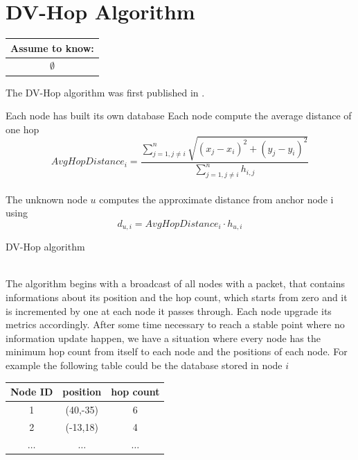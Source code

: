 \documentclass[12pt]{report}
\begin{document}
\section{DV-Hop Algorithm}
\begin{center}
    \begin{tabular}{ |c| } 
    \hline
    \multicolumn{1}{|c|}{ \textbf{Assume to know:} } \\
    \hline
    $\emptyset$\\
    \hline
    \end{tabular}
\end{center}
The DV-Hop algorithm was first published in \cite{965964}.\\
\begin{algorithm}[H]
\SetAlgoLined
{}
Each node has built its own database\;
Each node compute the average distance of one hop
\begin{equation}
    AvgHopDistance_i=\frac{\sum_{j=1,j\neq i}^n\sqrt{(x_j-x_i)^2+(y_j-y_i)^2}}{\sum_{j=1,j\neq i}^nh_{i,j}}
\end{equation}\\
The unknown node $u$ computes the approximate distance from anchor node i using 
\begin{equation}
    d_{u,i}=AvgHopDistance_i \cdot h_{u,i}
    \label{eq:19}
\end{equation}
 \caption{DV-Hop algorithm}
\end{algorithm}
\noindent\\
The algorithm begins with a broadcast of all nodes with a packet, that contains informations about its position and the hop count, which starts from zero and it is incremented by one at each node it passes through. Each node upgrade its metrics accordingly. After some time necessary to reach a stable point where no information update happen, we have a situation where every node has the minimum hop count from itself to each node and the positions of each node. For example the following table could be the database stored in node $i$
\begin{center}
\begin{tabular}{ |c|c|c| } 
 \hline
 Node ID & position & hop count \\ 
 \hline
 \hline
 1 & (40,-35) & 6 \\ 
 2 & (-13,18) & 4 \\
 $\hdots$ & $\hdots$ & $\hdots$\\
 \hline
\end{tabular}
\end{center}
\end{document}
